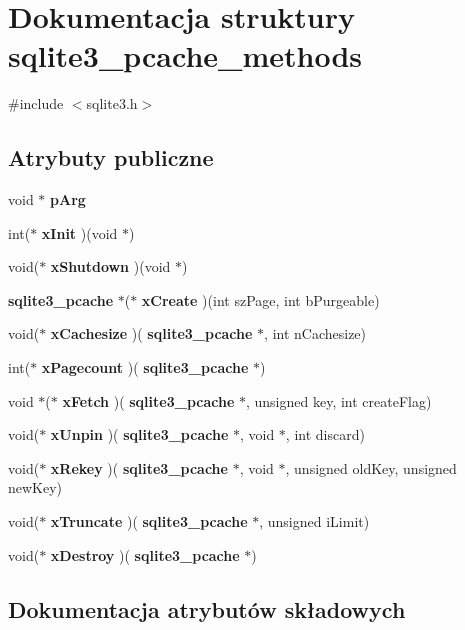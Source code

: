 \section{Dokumentacja struktury sqlite3\+\_\+pcache\+\_\+methods}
\label{structsqlite3__pcache__methods}


{\ttfamily \#include $<$sqlite3.\+h$>$}

\subsection*{Atrybuty publiczne}
\begin{DoxyCompactItemize}
\item 
void $\ast$ \textbf{ p\+Arg}
\item 
int($\ast$ \textbf{ x\+Init} )(void $\ast$)
\item 
void($\ast$ \textbf{ x\+Shutdown} )(void $\ast$)
\item 
\textbf{ sqlite3\+\_\+pcache} $\ast$($\ast$ \textbf{ x\+Create} )(int sz\+Page, int b\+Purgeable)
\item 
void($\ast$ \textbf{ x\+Cachesize} )(\textbf{ sqlite3\+\_\+pcache} $\ast$, int n\+Cachesize)
\item 
int($\ast$ \textbf{ x\+Pagecount} )(\textbf{ sqlite3\+\_\+pcache} $\ast$)
\item 
void $\ast$($\ast$ \textbf{ x\+Fetch} )(\textbf{ sqlite3\+\_\+pcache} $\ast$, unsigned key, int create\+Flag)
\item 
void($\ast$ \textbf{ x\+Unpin} )(\textbf{ sqlite3\+\_\+pcache} $\ast$, void $\ast$, int discard)
\item 
void($\ast$ \textbf{ x\+Rekey} )(\textbf{ sqlite3\+\_\+pcache} $\ast$, void $\ast$, unsigned old\+Key, unsigned new\+Key)
\item 
void($\ast$ \textbf{ x\+Truncate} )(\textbf{ sqlite3\+\_\+pcache} $\ast$, unsigned i\+Limit)
\item 
void($\ast$ \textbf{ x\+Destroy} )(\textbf{ sqlite3\+\_\+pcache} $\ast$)
\end{DoxyCompactItemize}


\subsection{Dokumentacja atrybutów składowych}
\mbox{\label{structsqlite3__pcache__methods_a90394a920f6a09dd13553aeb79bbed88}} 
